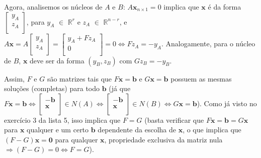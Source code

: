 \documentclass[leqno]{article}
\newcommand{\ezvecbi}[2]{\begin{bmatrix}
#1\\
#2\\
\end{bmatrix}}
\begin{document}
\begin{enumerate}
    Agora, analisemos os núcleos de $A$ e $B$: $A\textbf{x}_{n\times1}=0$ implica que $\textbf{x}$ é da forma $\begin{bmatrix}y_A\\z_A\\\end{bmatrix}$, para $y_A$ $\in$ $\mathbb{R}^r$ e $z_A$ $\in$ $\mathbb{R}^{n-r}$, e $A\textbf{x}=A\begin{bmatrix}y_A\\z_A\\\end{bmatrix}=\begin{bmatrix}y_A+Fz_A\\0\\\end{bmatrix}=0\iff Fz_A=-y_A$. Analogamente, para o núcleo de $B$, $\textbf{x}$ deve ser da forma $(y_B, z_B)$ com $Gz_B=-y_B$.
    
    Assim, $F$ e $G$ são matrizes tais que $F\textbf{x}=\textbf{b}$ e $G\textbf{x}=\textbf{b}$ possuem as mesmas soluções (completas) para todo $\textbf{b}$ (já que $F\textbf{x}=\textbf{b}\iff\ezvecbi{-\textbf{b}}{\textbf{x}}\in N(A)\iff\ezvecbi{-\textbf{b}}{\textbf{x}}\in N(B)\iff G\textbf{x}=\textbf{b}$). Como já visto no exercício 3 da lista 5, isso implica que $F=G$ (basta verificar que $F\textbf{x}=\textbf{b}=G\textbf{x}$ para $\textbf{x}$ qualquer e um certo $\textbf{b}$ dependente da escolha de $\textbf{x}$, o que implica que $(F-G)\textbf{x}=\textbf{0}$ para qualquer $\textbf{x}$, propriedade exclusiva da matriz nula $\Rightarrow (F-G)=0\iff F=G$).
    
    
\end{enumerate}

 
\end{document}

